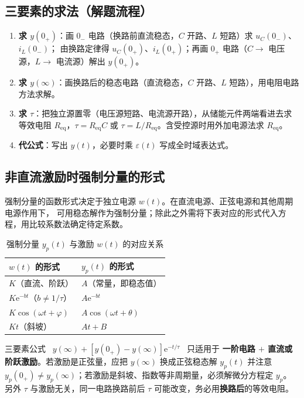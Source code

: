 \subsection{三要素的求法（解题流程）}
\begin{enumerate}
  \item \textbf{求 $y(0_+)$}：画 $0_-$ 电路（换路前直流稳态，$C$ 开路、$L$ 短路）求 $u_C(0_-)$、$i_L(0_-)$；
        由换路定律得 $u_C(0_+)$、$i_L(0_+)$；再画 $0_+$ 电路（$C\to$ 电压源，$L\to$ 电流源）解出 $y(0_+)$。
  \item \textbf{求 $y(\infty)$}：画换路后的稳态电路（直流稳态，$C$ 开路、$L$ 短路），用电阻电路方法求解。
  \item \textbf{求 $\tau$}：把独立源置零（电压源短路、电流源开路），从储能元件两端看进去求等效电阻
        $R_{\mathrm{eq}}$，$\tau=R_{\mathrm{eq}}C$ 或 $\tau=L/R_{\mathrm{eq}}$。含受控源时用外加电源法求 $R_{\mathrm{eq}}$。
  \item \textbf{代公式}：写出 $y(t)$，必要时乘 $\varepsilon(t)$ 写成全时域表达式。
\end{enumerate}

\subsection{非直流激励时强制分量的形式}
强制分量的函数形式决定于独立电源 $w(t)$。在直流电源、正弦电源和其他周期电源作用下，
可用稳态解作为强制分量；除此之外需将下表对应的形式代入方程，用比较系数法确定待定系数。

\begin{table}[htbp]
  \centering
  \renewcommand{\tablename}{表}%
  \caption{强制分量 $y_p(t)$ 与激励 $w(t)$ 的对应关系}
  \begin{tabular}{ll}
    \toprule
    $w(t)$ 的形式 & $y_p(t)$ 的形式 \\
    \midrule
    $K$（直流、阶跃） & $A$（常量，即稳态值） \\
    $K\mathrm{e}^{-bt}$（$b\ne 1/\tau$） & $A\mathrm{e}^{-bt}$ \\
    $K\cos(\omega t+\varphi)$ & $A\cos(\omega t+\theta)$ \\
    $Kt$（斜坡） & $At+B$ \\
    \bottomrule
  \end{tabular}
\end{table}

\begin{corepoint}{三要素公式 \ $y(\infty)+\left[y(0_+)-y(\infty)\right]\mathrm{e}^{-t/\tau}$ \ 只适用于
\textbf{一阶电路 $+$ 直流或阶跃激励}。若激励是正弦量，应把 $y(\infty)$ 换成正弦稳态解
$y_p(t)$ 并注意 $y_p(0_+)\ne y_p(\infty)$；若激励是斜坡、指数等非周期量，必须解微分方程定 $y_p$。
另外 $\tau$ 与激励无关，同一电路换路前后 $\tau$ 可能改变，务必用\textbf{换路后}的等效电阻。}
\end{corepoint}

